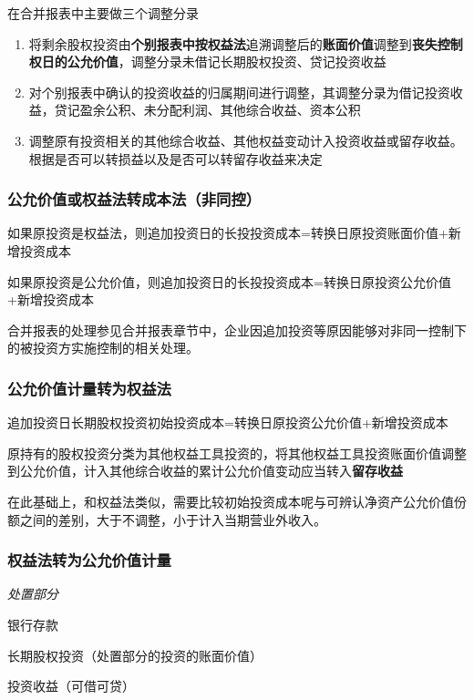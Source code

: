 \documentclass[UTF8,12pt]{ctexart}
\newenvironment{Dr}{%
	\begin{list}{}%
		{
			\setlength{\leftmargin}{2em}
			\setlength{\labelwidth}{2em}
			\setlength{\labelsep}{0pt}
			\setlength{\itemindent}{0pt}
			\setlength{\listparindent}{0pt}
			\setlength{\parsep}{0pt}
			\setlength{\topsep}{0pt}
		}
		\item[\textbf{借：}]
	}{%
	\end{list}
}
\newenvironment{Cr}{%
	\begin{list}{}%
		{
			\setlength{\leftmargin}{3em}
			\setlength{\labelwidth}{2em}
			\setlength{\labelsep}{0pt}
			\setlength{\itemindent}{0pt}
			\setlength{\listparindent}{0pt}
			\setlength{\parsep}{0pt}
			\setlength{\topsep}{0pt}
		}
		\item[\textbf{贷：}]
	}{%
	\end{list}
}
\numberwithin{equation}{section} %
\numberwithin{figure}{section}
\numberwithin{table}{section}
\begin{document}
	在合并报表中主要做三个调整分录
	\begin{enumerate}
		\item 将剩余股权投资由\textbf{个别报表中按权益法}追溯调整后的\textbf{账面价值}调整到\textbf{丧失控制权日的公允价值}，调整分录未借记长期股权投资、贷记投资收益
		
		\item 对个别报表中确认的投资收益的归属期间进行调整，其调整分录为借记投资收益，贷记盈余公积、未分配利润、其他综合收益、资本公积
		
		\item 调整原有投资相关的其他综合收益、其他权益变动计入投资收益或留存收益。根据是否可以转损益以及是否可以转留存收益来决定
	\end{enumerate}
	
	\subsubsection{公允价值或权益法转成本法（非同控）}
	如果原投资是权益法，则追加投资日的长投投资成本=转换日原投资账面价值+新增投资成本
	
	如果原投资是公允价值，则追加投资日的长投投资成本=转换日原投资公允价值+新增投资成本
	
	合并报表的处理参见合并报表章节中，企业因追加投资等原因能够对非同一控制下的被投资方实施控制的相关处理。
	
	\subsubsection{公允价值计量转为权益法}
	
	追加投资日长期股权投资初始投资成本=转换日原投资公允价值+新增投资成本
	
	原持有的股权投资分类为其他权益工具投资的，将其他权益工具投资账面价值调整到公允价值，计入其他综合收益的累计公允价值变动应当转入\textbf{留存收益}
	
	在此基础上，和权益法类似，需要比较初始投资成本呢与可辨认净资产公允价值份额之间的差别，大于不调整，小于计入当期营业外收入。
	
	\subsubsection{权益法转为公允价值计量}
	\textit{处置部分}
	
	\begin{Dr}
		银行存款
	\end{Dr}
	\begin{Cr}
		长期股权投资（处置部分的投资的账面价值）
		
		投资收益（可借可贷）
	\end{Cr}
	
\end{document}
